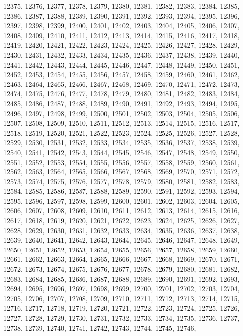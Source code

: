 12375,
12376,
12377,
12378,
12379,
12380,
12381,
12382,
12383,
12384,
12385,
12386,
12387,
12388,
12389,
12390,
12391,
12392,
12393,
12394,
12395,
12396,
12397,
12398,
12399,
12400,
12401,
12402,
12403,
12404,
12405,
12406,
12407,
12408,
12409,
12410,
12411,
12412,
12413,
12414,
12415,
12416,
12417,
12418,
12419,
12420,
12421,
12422,
12423,
12424,
12425,
12426,
12427,
12428,
12429,
12430,
12431,
12432,
12433,
12434,
12435,
12436,
12437,
12438,
12439,
12440,
12441,
12442,
12443,
12444,
12445,
12446,
12447,
12448,
12449,
12450,
12451,
12452,
12453,
12454,
12455,
12456,
12457,
12458,
12459,
12460,
12461,
12462,
12463,
12464,
12465,
12466,
12467,
12468,
12469,
12470,
12471,
12472,
12473,
12474,
12475,
12476,
12477,
12478,
12479,
12480,
12481,
12482,
12483,
12484,
12485,
12486,
12487,
12488,
12489,
12490,
12491,
12492,
12493,
12494,
12495,
12496,
12497,
12498,
12499,
12500,
12501,
12502,
12503,
12504,
12505,
12506,
12507,
12508,
12509,
12510,
12511,
12512,
12513,
12514,
12515,
12516,
12517,
12518,
12519,
12520,
12521,
12522,
12523,
12524,
12525,
12526,
12527,
12528,
12529,
12530,
12531,
12532,
12533,
12534,
12535,
12536,
12537,
12538,
12539,
12540,
12541,
12542,
12543,
12544,
12545,
12546,
12547,
12548,
12549,
12550,
12551,
12552,
12553,
12554,
12555,
12556,
12557,
12558,
12559,
12560,
12561,
12562,
12563,
12564,
12565,
12566,
12567,
12568,
12569,
12570,
12571,
12572,
12573,
12574,
12575,
12576,
12577,
12578,
12579,
12580,
12581,
12582,
12583,
12584,
12585,
12586,
12587,
12588,
12589,
12590,
12591,
12592,
12593,
12594,
12595,
12596,
12597,
12598,
12599,
12600,
12601,
12602,
12603,
12604,
12605,
12606,
12607,
12608,
12609,
12610,
12611,
12612,
12613,
12614,
12615,
12616,
12617,
12618,
12619,
12620,
12621,
12622,
12623,
12624,
12625,
12626,
12627,
12628,
12629,
12630,
12631,
12632,
12633,
12634,
12635,
12636,
12637,
12638,
12639,
12640,
12641,
12642,
12643,
12644,
12645,
12646,
12647,
12648,
12649,
12650,
12651,
12652,
12653,
12654,
12655,
12656,
12657,
12658,
12659,
12660,
12661,
12662,
12663,
12664,
12665,
12666,
12667,
12668,
12669,
12670,
12671,
12672,
12673,
12674,
12675,
12676,
12677,
12678,
12679,
12680,
12681,
12682,
12683,
12684,
12685,
12686,
12687,
12688,
12689,
12690,
12691,
12692,
12693,
12694,
12695,
12696,
12697,
12698,
12699,
12700,
12701,
12702,
12703,
12704,
12705,
12706,
12707,
12708,
12709,
12710,
12711,
12712,
12713,
12714,
12715,
12716,
12717,
12718,
12719,
12720,
12721,
12722,
12723,
12724,
12725,
12726,
12727,
12728,
12729,
12730,
12731,
12732,
12733,
12734,
12735,
12736,
12737,
12738,
12739,
12740,
12741,
12742,
12743,
12744,
12745,
12746,
